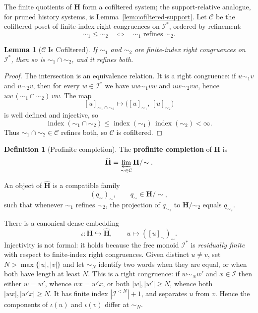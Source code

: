 \documentclass[12pt]{article}
\newtheorem{lemma}[theorem]{Lemma}
\theoremstyle{definition}
\newtheorem{definition}[theorem]{Definition}
\begin{document}
The finite quotients of $\mathbf H$ form a cofiltered system; the
support-relative analogue, for pruned history systems, is
Lemma~\ref{lem:cofiltered-support}.  Let $\mathcal C$ be the cofiltered poset
of finite-index right congruences on $\mathcal I^*$, ordered by refinement:
\[
\sim_1\le\sim_2
\quad\Longleftrightarrow\quad
\sim_1\text{ refines }\sim_2.
\]

\begin{lemma}[$\mathcal C$ Is Cofiltered]
\label{lem:cofiltered}
If $\sim_1$ and $\sim_2$ are finite-index right congruences on $\mathcal I^*$,
then so is $\sim_1\cap\sim_2$, and it refines both.
\end{lemma}

\begin{proof}
The intersection is an equivalence relation.  It is a right congruence: if
$u\sim_1v$ and $u\sim_2v$, then for every $w\in\mathcal I^*$ we have
$uw\sim_1vw$ and $uw\sim_2vw$, hence
$uw\,(\sim_1\cap\sim_2)\,vw$.  The map
\[
[u]_{\sim_1\cap\sim_2}
\mapsto
\bigl([u]_{\sim_1},\,[u]_{\sim_2}\bigr)
\]
is well defined and injective, so
\[
\operatorname{index}(\sim_1\cap\sim_2)
\le
\operatorname{index}(\sim_1)\,
\operatorname{index}(\sim_2)
<
\infty.
\]
Thus $\sim_1\cap\sim_2\in\mathcal C$ refines both, so $\mathcal C$ is
cofiltered.
\end{proof}

\begin{definition}[Profinite completion]
\label{def:profinite-completion}
The \textbf{profinite completion} of $\mathbf H$ is
\[
\widehat{\mathbf H}
=
\varprojlim_{\sim\in\mathcal C}
\mathbf H/\!\sim.
\]
\end{definition}

An object of $\widehat{\mathbf H}$ is a compatible family
\[
(q_\sim)_\sim,
\qquad
q_\sim\in\mathbf H/\!\sim,
\]
such that whenever $\sim_1$ refines $\sim_2$, the projection of
$q_{\sim_1}$ to $\mathbf H/\!\sim_2$ equals $q_{\sim_2}$.

There is a canonical dense embedding
\[
\iota:\mathbf H\hookrightarrow\widehat{\mathbf H},
\qquad
u\mapsto([u]_\sim)_\sim.
\]
Injectivity is not formal: it holds because the free monoid $\mathcal I^*$ is
\emph{residually finite} with respect to finite-index right congruences.
Given distinct $u\ne v$, set $N>\max\{|u|,|v|\}$ and let $\sim_N$ identify two
words when they are equal, or when both have length at least $N$.  This is a
right congruence: if $w\sim_Nw'$ and $x\in\mathcal I$ then either $w=w'$, whence
$wx=w'x$, or both $|w|,|w'|\ge N$, whence both $|wx|,|w'x|\ge N$.  It has
finite index $|\mathcal I^{<N}|+1$, and separates $u$ from $v$.  Hence the
components of $\iota(u)$ and $\iota(v)$ differ at $\sim_N$.
\end{document}
